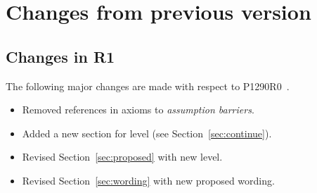 \section{Changes from previous version}

\subsection{Changes in R1}

The following major changes are made with respect to P1290R0~\cite{p1290r0}.

\begin{itemize}
  \item Removed references in axioms to \emph{assumption barriers}.
  \item Added a new section for  level (see Section~\ref{sec:continue}).
  \item Revised Section~\ref{sec:proposed} with new  level.
  \item Revised Section~\ref{sec:wording} with new proposed wording.
\end{itemize}
